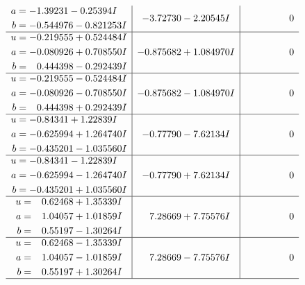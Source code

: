 \documentclass[1p]{elsarticle_modified}
\theoremstyle{definition}
\begin{document}
$$\begin{array}{c|c|c}
\begin{aligned}
a &= -1.39231 - 0.25394 I \\
b &= -0.544976 - 0.821253 I\end{aligned}
 & -3.72730 - 2.20545 I & \phantom{-0.000000 } 0 \\ \hline\begin{aligned}
u &= -0.219555 + 0.524484 I \\
a &= -0.080926 + 0.708550 I \\
b &= \phantom{-}0.444398 - 0.292439 I\end{aligned}
 & -0.875682 + 1.084970 I & \phantom{-0.000000 } 0 \\ \hline\begin{aligned}
u &= -0.219555 - 0.524484 I \\
a &= -0.080926 - 0.708550 I \\
b &= \phantom{-}0.444398 + 0.292439 I\end{aligned}
 & -0.875682 - 1.084970 I & \phantom{-0.000000 } 0 \\ \hline\begin{aligned}
u &= -0.84341 + 1.22839 I \\
a &= -0.625994 + 1.264740 I \\
b &= -0.435201 - 1.035560 I\end{aligned}
 & -0.77790 - 7.62134 I & \phantom{-0.000000 } 0 \\ \hline\begin{aligned}
u &= -0.84341 - 1.22839 I \\
a &= -0.625994 - 1.264740 I \\
b &= -0.435201 + 1.035560 I\end{aligned}
 & -0.77790 + 7.62134 I & \phantom{-0.000000 } 0 \\ \hline\begin{aligned}
u &= \phantom{-}0.62468 + 1.35339 I \\
a &= \phantom{-}1.04057 + 1.01859 I \\
b &= \phantom{-}0.55197 - 1.30264 I\end{aligned}
 & \phantom{-}7.28669 + 7.75576 I & \phantom{-0.000000 } 0 \\ \hline\begin{aligned}
u &= \phantom{-}0.62468 - 1.35339 I \\
a &= \phantom{-}1.04057 - 1.01859 I \\
b &= \phantom{-}0.55197 + 1.30264 I\end{aligned}
 & \phantom{-}7.28669 - 7.75576 I & \phantom{-0.000000 } 0\\
 \hline 

\end{array}$$
\end{document}
